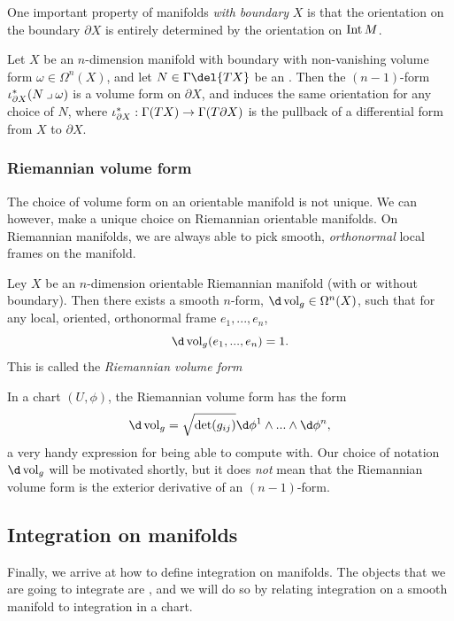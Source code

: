 One important property of manifolds \emph{with boundary} \(X\) is that the orientation on the boundary \(\partial X\) is entirely determined by the orientation on \(\operatorname{Int} M\).
\begin{definition}
	\label{def:induced_orientation}
	Let \(X\) be an \(n\)-dimension manifold with boundary with non-vanishing volume form \(\omega\in \Omega^n(X)\), and let \(N\in \Gamma\del{TX}\) be an .
	Then the \((n-1)\)-form \(\iota_{\partial X}^* (N \mathbin{\lrcorner} \omega)\) is a volume form on \(\partial X\), and induces the same orientation for any choice of \(N\), where \(\iota_{\partial X}^*: \Gamma(TX)\to \Gamma(T\partial X)\) is the pullback of a differential form from \(X\) to \(\partial X\).
\end{definition}


\subsubsection{Riemannian volume form}
The choice of volume form on an orientable manifold is not unique.
We can however, make a unique choice on Riemannian orientable manifolds.
On Riemannian manifolds, we are always able to pick smooth, \emph{orthonormal} local frames on the manifold.
\begin{proposition}
	\label{prop:riemannian_volume_form}
	Ley \(X\) be an \(n\)-dimension orientable Riemannian manifold (with or without boundary).
	Then there exists a smooth \(n\)-form, \(\d\vol_g \in \Omega^n(X)\), such that for any local, oriented, orthonormal frame \(e_1, ..., e_n\), 
	\[
		\d\vol_g(e_1, ..., e_n) = 1	
	.\]
	This is called the \emph{Riemannian volume form}
\end{proposition}
In a chart \((U, \phi)\), the Riemannian volume form has the form
\[
	\d\vol_g = \sqrt{\det(g_{ij})} \d\phi^1 \wedge ... \wedge \d\phi^n
,\] a very handy expression for being able to compute with.
Our choice of notation \(\d\vol_g\) will be motivated shortly, but it does \emph{not} mean that the Riemannian volume form is the exterior derivative of an \((n-1)\)-form.


\subsection{Integration on manifolds}
Finally, we arrive at how to define integration on manifolds.
The objects that we are going to integrate are , and we will do so by relating integration on a smooth manifold to integration in a chart.

